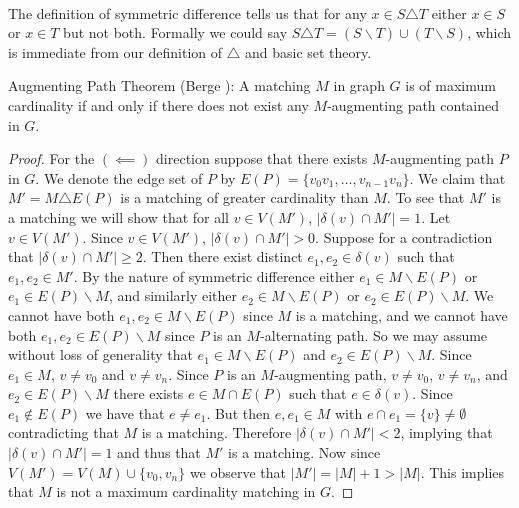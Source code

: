\paragraph{}
The definition of symmetric difference tells us that for any $x \in S \triangle T$ either $x \in S$ or $x \in T$ but not both. Formally we could say $S \triangle T = (S \backslash T) \cup (T \backslash S)$, which is immediate from our definition of $\triangle$ and basic set theory.
\begin{theorem} Augmenting Path Theorem (Berge \cite{berge1957two}): A matching $M$ in graph $G$ is of maximum cardinality if and only if there does not exist any $M$-augmenting path contained in $G$.
\end{theorem}
\begin{proof}For the $(\impliedby)$ direction suppose that there exists $M$-augmenting path $P$ in $G$. We denote the edge set of $P$ by $E(P) = \{v_0v_1, \dots, v_{n-1}v_n\}$. We claim that $M' = M \triangle E(P)$ is a matching of greater cardinality than $M$. To see that $M'$ is a matching we will show that for all $v \in V(M')$, $|\delta(v) \cap M'| = 1$. Let $v \in V(M')$. Since $v \in V(M')$, $|\delta(v) \cap M'| > 0$. Suppose for a contradiction that $|\delta(v) \cap M'| \geq 2$. Then there exist distinct $e_1, e_2 \in \delta(v)$ such that $e_1, e_2 \in M'$. By the nature of symmetric difference either $e_1 \in M \backslash E(P)$ or $e_1 \in E(P) \backslash M$, and similarly either $e_2 \in M \backslash E(P)$ or $ e_2 \in E(P)\backslash M$. We cannot have both $e_1, e_2 \in M \backslash E(P)$ since $M$ is a matching, and we cannot have both $e_1, e_2 \in E(P) \backslash M$ since $P$ is an $M$-alternating path. So we may assume without loss of generality that $e_1 \in M \backslash E(P)$ and $e_2 \in E(P) \backslash M$. Since $e_1 \in M$, $v \neq v_0$ and $v \neq v_n$. Since $P$ is an $M$-augmenting path, $v \neq v_0$, $v \neq v_n$, and $e_2 \in E(P) \backslash M$ there exists $e \in M \cap E(P)$ such that $e \in \delta(v)$. Since $e_1 \not\in E(P)$ we have that $e \neq e_1$. But then $e, e_1 \in M$ with $e \cap e_1 = \{v\} \neq \emptyset$ contradicting that $M$ is a matching. Therefore $|\delta(v) \cap M'| < 2$, implying that $|\delta(v) \cap M'| = 1$ and thus that $M'$ is a matching. Now since $V(M') = V(M) \cup \{v_0, v_n\}$ we observe that $|M'| = |M| + 1 > |M|$. This implies that $M$ is not a maximum cardinality matching in $G$.

\end{proof}
